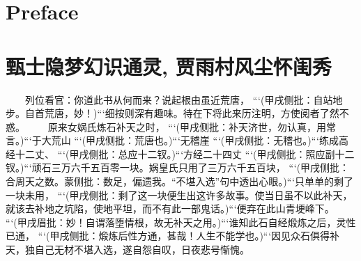 \documentclass[
    ref = refDemo.bib,
    coverpage = cover.pdf,
    geometry = b5,
    lang = cn
]{spBook}
\date{\today}
\begin{document}
    \frontmatter
    \maketitle
    \tableofcontents
    \chapter{Preface}
    \lipsum[1-10]

    \mainmatter
    \chapter{甄士隐梦幻识通灵, 贾雨村风尘怀闺秀}
    　　列位看官：你道此书从何而来？说起根由虽近荒唐， ```(甲戌侧批：自站地步。自首荒唐，妙！)```细按则深有趣味。待在下将此来历注明，方使阅者了然不惑。  
    　　原来女娲氏炼石补天之时， ```(甲戌侧批：补天济世，勿认真，用常言。)```于大荒山 ```(甲戌侧批：荒唐也。)```无稽崖 ```(甲戌侧批：无稽也。)```练成高经十二丈、 ```(甲戌侧批：总应十二钗。)```方经二十四丈 ```(甲戌侧批：照应副十二钗。)```顽石三万六千五百零一块。娲皇氏只用了三万六千五百块， ```(甲戌侧批：合周天之数。蒙侧批：数足，偏遗我。“不堪入选”句中透出心眼。)```只单单的剩了一块未用， ```(甲戌侧批：剩了这一块便生出这许多故事。使当日虽不以此补天，就该去补地之坑陷，使地平坦，而不有此一部鬼话。)```便弃在此山青埂峰下。 ```(甲戌眉批：妙！自谓落堕情根，故无补天之用。)```谁知此石自经煅炼之后，灵性已通， ```(甲戌侧批：煅炼后性方通，甚哉！人生不能学也。)```因见众石俱得补天，独自己无材不堪入选，遂自怨自叹，日夜悲号惭愧。  
\end{document}

